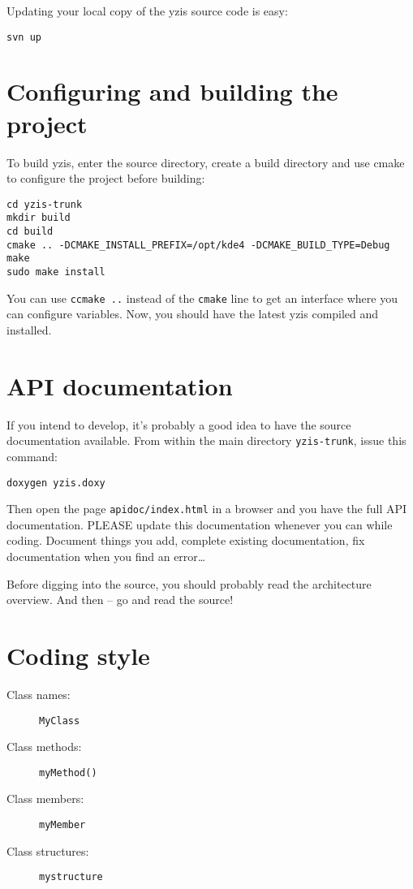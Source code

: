 \documentclass[a4paper,12pt]{report}
\begin{document}
Updating your local copy of the yzis source code is easy:

\begin{verbatim}
svn up
\end{verbatim}

\section{Configuring and building the project}

To build yzis, enter the source directory, create a build directory and use
cmake to configure the project before building:

\begin{verbatim}
cd yzis-trunk
mkdir build
cd build
cmake .. -DCMAKE_INSTALL_PREFIX=/opt/kde4 -DCMAKE_BUILD_TYPE=Debug
make
sudo make install
\end{verbatim}

You can use \verb+ccmake ..+ instead of the \verb+cmake+ line to get an
interface where you can configure variables.
Now, you should have the latest yzis compiled and installed.

\section{API documentation}

If you intend to develop, it's probably a good idea to have the source
documentation available. From within the main directory \verb+yzis-trunk+, issue
this command:

\begin{verbatim}
doxygen yzis.doxy
\end{verbatim}

Then open the page \verb+apidoc/index.html+ in a browser and you
have the full API documentation. PLEASE update this documentation whenever you
can while coding. Document things you add, complete existing documentation, fix
documentation when you find an error\ldots{}

Before digging into the source, you should probably read the architecture
overview. And then -- go and read the source!

\section{Coding style}

\begin{description}
	\item[Class names:] \verb+MyClass+
	\item[Class methods:] \verb+myMethod()+
	\item[Class members:] \verb+myMember+
	\item[Class structures:] \verb+mystructure+
\end{description}
\end{document}
